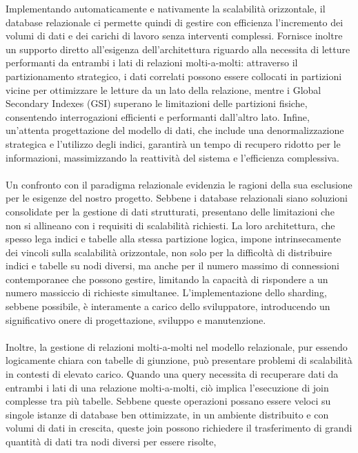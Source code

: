 Implementando automaticamente e nativamente la scalabilità orizzontale,
il database relazionale ci permette quindi di gestire con efficienza 
l'incremento dei volumi di dati e dei carichi di lavoro senza interventi complessi.
Fornisce inoltre un supporto diretto all'esigenza dell'architettura 
riguardo alla necessita di letture performanti 
da entrambi i lati di relazioni molti-a-molti:
attraverso il partizionamento strategico, 
i dati correlati possono essere collocati in partizioni vicine 
per ottimizzare le letture da un lato della relazione, 
mentre i Global Secondary Indexes (GSI) superano le limitazioni delle partizioni fisiche, 
consentendo interrogazioni efficienti e performanti dall'altro lato. 
Infine, un'attenta progettazione del modello di dati, 
che include una denormalizzazione strategica e l'utilizzo degli indici, 
garantirà un tempo di recupero ridotto per le informazioni, 
massimizzando la reattività del sistema e l'efficienza complessiva.\\
\\
Un confronto con il paradigma relazionale evidenzia le ragioni della sua esclusione per le esigenze del nostro progetto. 
Sebbene i database relazionali siano soluzioni consolidate per la gestione di dati strutturati, 
presentano delle limitazioni che non si allineano con i requisiti di scalabilità richiesti. 
La loro architettura, che spesso lega indici e tabelle alla stessa partizione logica, 
impone intrinsecamente dei vincoli sulla scalabilità orizzontale, 
non solo per la difficoltà di distribuire indici e tabelle su nodi diversi, 
ma anche per il numero massimo di connessioni contemporanee che possono gestire, 
limitando la capacità di rispondere a un numero massiccio di richieste simultanee.  
L'implementazione dello sharding, sebbene possibile, è interamente a carico dello sviluppatore, 
introducendo un significativo onere di progettazione, sviluppo e manutenzione.\\
\\
Inoltre, la gestione di relazioni molti-a-molti nel modello relazionale, 
pur essendo logicamente chiara con tabelle di giunzione, 
può presentare problemi di scalabilità in contesti di elevato carico. 
Quando una query necessita di recuperare dati da entrambi i lati di una relazione molti-a-molti, 
ciò implica l'esecuzione di join complesse tra più tabelle. 
Sebbene queste operazioni possano essere veloci su singole istanze di database ben ottimizzate, 
in un ambiente distribuito e con volumi di dati in crescita, 
queste join possono richiedere il trasferimento di grandi quantità di dati tra nodi diversi per essere risolte, 
